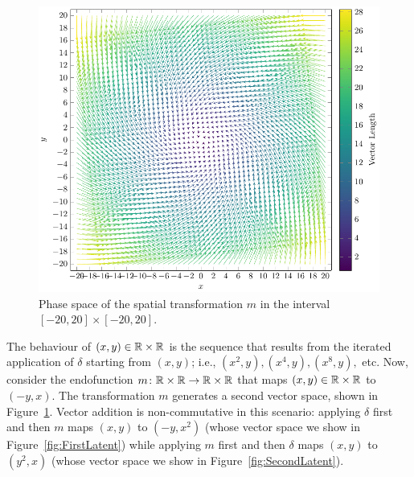   \begin{figure}[t]
    \centering  
    \includegraphics[width=\textwidth]{Figures/VectorSpace2.pdf} 
    \caption{Phase space of the spatial transformation $m$ in the interval $[-20,20]\times[-20,20]$.} 
    \label{fig:SpatialDeformation} 
\end{figure} 
The behaviour of $(x,y)\in \mathbb{R}\times\mathbb{R}$ is the sequence that results from the iterated application of $\delta$ starting from $(x,y)$; i.e., $(x^2,y),(x^4,y),(x^8,y),$ etc. Now, consider the endofunction $m\colon \mathbb{R}\times\mathbb{R}\rightarrow \mathbb{R}\times\mathbb{R}$ that maps $(x,y)\in \mathbb{R}\times\mathbb{R}$ to $(-y,x)$. The transformation $m$ generates a second vector space, shown in Figure~\ref{fig:SpatialDeformation}. Vector addition is non-commutative in this scenario: applying $\delta$ first and then $m$ maps $(x,y)$ %
to $(-y,x^2)$ (whose vector space we show in Figure~\ref{fig:FirstLatent}) while applying $m$ first and then $\delta$ maps $(x,y)$ to $(y^2,x)$ (whose vector space we show in Figure~\ref{fig:SecondLatent}). %

